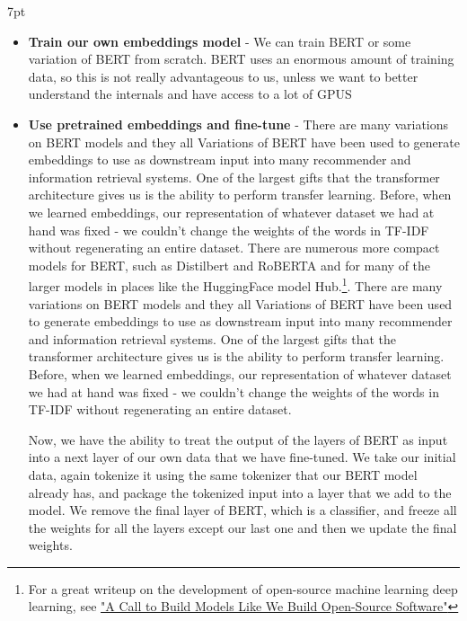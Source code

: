 \documentclass[11pt, table]{diazessay} %
\newenvironment{formal}{%
  \def\FrameCommand{%
    \hspace{1pt}%
    {\color{w_lightblue}\vrule width 2pt}%
    {\color{formalshade}\vrule width 4pt}%
    \colorbox{formalshade}%
  }%
  \MakeFramed{\advance\hsize-\width\FrameRestore}%
  \noindent\hspace{-4.55pt}%
  \begin{adjustwidth}{}{7pt}%
  \vspace{2pt}\vspace{2pt}%
}
{%
  \vspace{2pt}\end{adjustwidth}\endMakeFramed%
}
\begin{document}
\begin{sloppypar}
\begin{formal}
\begin{itemize}
\item \textbf{Train our own embeddings model} - We can train BERT or some variation of BERT from scratch. BERT uses an enormous amount of training data, so this is not really advantageous to us, unless we want to better understand the internals and have access to a lot of GPUS
\item \textbf{Use pretrained embeddings and fine-tune } - There are many variations on BERT models and they all Variations of BERT have been used to generate embeddings to use as downstream input into many recommender and information retrieval systems.  One of the largest gifts that the transformer architecture gives us is the ability to perform transfer learning. Before, when we learned embeddings, our representation of whatever dataset we had at hand was fixed - we couldn't change the weights of the words in TF-IDF without regenerating an entire dataset. There are numerous more compact models for BERT, such as Distilbert and RoBERTA and for many of the larger models in places like the HuggingFace model Hub.\footnote{For a great writeup on the development of open-source machine learning deep learning, see  \href{https://colinraffel.com/blog/a-call-to-build-models-like-we-build-open-source-software.html}{"A Call to Build Models Like We Build Open-Source Software"}}.  There are many variations on BERT models and they all Variations of BERT have been used to generate embeddings to use as downstream input into many recommender and information retrieval systems.  One of the largest gifts that the transformer architecture gives us is the ability to perform transfer learning. Before, when we learned embeddings, our representation of whatever dataset we had at hand was fixed - we couldn't change the weights of the words in TF-IDF without regenerating an entire dataset. 

Now, we have the ability to treat the output of the layers of BERT as input into a next layer of our own data that we have fine-tuned. We take our initial data, again tokenize it using the same tokenizer that our BERT model already has, and package the tokenized input into a layer that we add to the model. We remove the final layer of BERT, which is a classifier, and freeze all the weights for all the layers except our last one and then we update the final weights. 

\end{itemize}
\end{formal}


\end{sloppypar}
\end{document}
